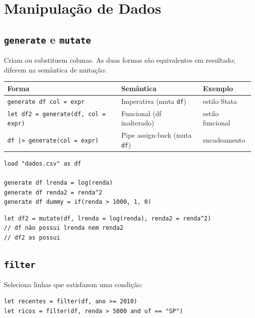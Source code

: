 \chapter{Manipulação de Dados}

\section{\texttt{generate} e \texttt{mutate}}

Criam ou substituem colunas. As duas formas são equivalentes em resultado; diferem
na semântica de mutação:

\begin{center}
\begin{tabular}{lll}
\toprule
\textbf{Forma} & \textbf{Semântica} & \textbf{Exemplo} \\
\midrule
\texttt{generate df col = expr}     & Imperativa (muta \texttt{df}) & estilo Stata \\
\texttt{let df2 = generate(df, col = expr)} & Funcional (df inalterado) & estilo funcional \\
\texttt{df |> generate(col = expr)} & Pipe assign-back (muta \texttt{df}) & encadeamento \\
\bottomrule
\end{tabular}
\end{center}

\begin{lstlisting}[caption={generate: forma imperativa}]
load "dados.csv" as df

generate df lrenda = log(renda)
generate df renda2 = renda^2
generate df dummy = if(renda > 1000, 1, 0)
\end{lstlisting}

\begin{lstlisting}[caption={mutate: forma funcional}]
let df2 = mutate(df, lrenda = log(renda), renda2 = renda^2)
// df não possui lrenda nem renda2
// df2 as possui
\end{lstlisting}

\section{\texttt{filter}}

Seleciona linhas que satisfazem uma condição:

\begin{lstlisting}
let recentes = filter(df, ano >= 2010)
let ricos = filter(df, renda > 5000 and uf == "SP")
\end{lstlisting}

